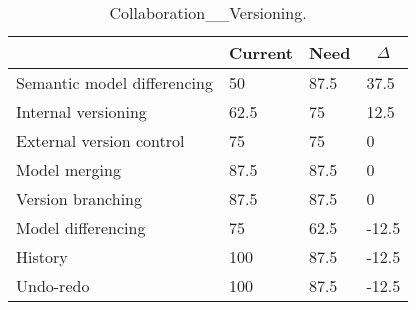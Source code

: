 
  \begin{table*}[]
  \centering
  \notsotiny
  \caption{ Collaboration__Versioning.}
\label{tab:collaboration__versioning}
\begin{tabular}{|l|l|l|l|}
  \hline
  \rowcolor[HTML]{C0C0C0}
    \multicolumn{1}{|c|}{Feature} & \multicolumn{1}{c|}{Current} & \multicolumn{1}{c|}{Need} & \multicolumn{1}{c|}{$\Delta$} \\ \hline
  Semantic model differencing & 50 & 87.5 & 37.5 \\ \hline 
Internal versioning & 62.5 & 75 & 12.5 \\ \hline 
External version control & 75 & 75 & 0 \\ \hline 
Model merging & 87.5 & 87.5 & 0 \\ \hline 
Version branching & 87.5 & 87.5 & 0 \\ \hline 
Model differencing & 75 & 62.5 & -12.5 \\ \hline 
History & 100 & 87.5 & -12.5 \\ \hline 
Undo-redo & 100 & 87.5 & -12.5 \\ \hline 
\end{tabular}%
  \end{table*}